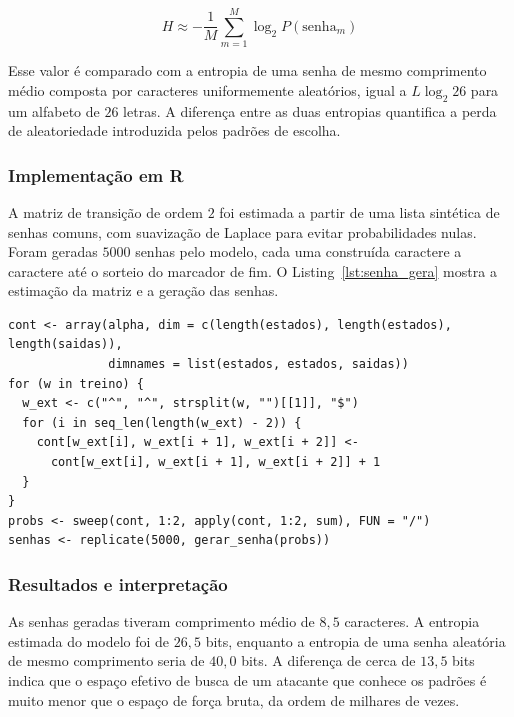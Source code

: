 \begin{equation}
	H \approx -\frac{1}{M} \sum_{m=1}^{M} \log_2 P(\text{senha}_m)
	\label{eq:senha_entropia}
\end{equation}

Esse valor é comparado com a entropia de uma senha de mesmo comprimento médio
composta por caracteres uniformemente aleatórios, igual a $L \log_2 26$ para um
alfabeto de $26$ letras. A diferença entre as duas entropias quantifica a perda de
aleatoriedade introduzida pelos padrões de escolha.

\subsubsection{Implementação em R}

A matriz de transição de ordem $2$ foi estimada a partir de uma lista sintética de
senhas comuns, com suavização de Laplace para evitar probabilidades nulas. Foram
geradas $5000$ senhas pelo modelo, cada uma construída caractere a caractere até o
sorteio do marcador de fim. O Listing~\ref{lst:senha_gera} mostra a estimação da
matriz e a geração das senhas.

\begin{lstlisting}[caption={Estimação da matriz de transição e geração das senhas.}, label={lst:senha_gera}]
cont <- array(alpha, dim = c(length(estados), length(estados), length(saidas)),
              dimnames = list(estados, estados, saidas))
for (w in treino) {
  w_ext <- c("^", "^", strsplit(w, "")[[1]], "$")
  for (i in seq_len(length(w_ext) - 2)) {
    cont[w_ext[i], w_ext[i + 1], w_ext[i + 2]] <-
      cont[w_ext[i], w_ext[i + 1], w_ext[i + 2]] + 1
  }
}
probs <- sweep(cont, 1:2, apply(cont, 1:2, sum), FUN = "/")
senhas <- replicate(5000, gerar_senha(probs))
\end{lstlisting}

\subsubsection{Resultados e interpretação}

As senhas geradas tiveram comprimento médio de $8{,}5$ caracteres. A entropia
estimada do modelo foi de $26{,}5$ bits, enquanto a entropia de uma senha aleatória
de mesmo comprimento seria de $40{,}0$ bits. A diferença de cerca de $13{,}5$ bits
indica que o espaço efetivo de busca de um atacante que conhece os padrões é muito
menor que o espaço de força bruta, da ordem de milhares de vezes.

